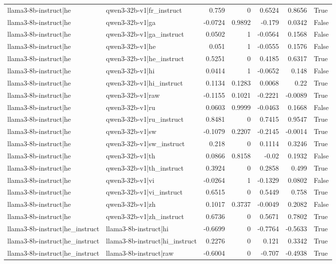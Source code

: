 \begin{table}
\begin{tabular}{l l r r r r l}
llama3-8b-instruct|he & qwen3-32b-v1|fr_instruct & 0.759 & 0 & 0.6524 & 0.8656 & True \\
llama3-8b-instruct|he & qwen3-32b-v1|ga & -0.0724 & 0.9892 & -0.179 & 0.0342 & False \\
llama3-8b-instruct|he & qwen3-32b-v1|ga_instruct & 0.0502 & 1 & -0.0564 & 0.1568 & False \\
llama3-8b-instruct|he & qwen3-32b-v1|he & 0.051 & 1 & -0.0555 & 0.1576 & False \\
llama3-8b-instruct|he & qwen3-32b-v1|he_instruct & 0.5251 & 0 & 0.4185 & 0.6317 & True \\
llama3-8b-instruct|he & qwen3-32b-v1|hi & 0.0414 & 1 & -0.0652 & 0.148 & False \\
llama3-8b-instruct|he & qwen3-32b-v1|hi_instruct & 0.1134 & 0.1283 & 0.0068 & 0.22 & True \\
llama3-8b-instruct|he & qwen3-32b-v1|raw & -0.1155 & 0.1021 & -0.2221 & -0.0089 & True \\
llama3-8b-instruct|he & qwen3-32b-v1|ru & 0.0603 & 0.9999 & -0.0463 & 0.1668 & False \\
llama3-8b-instruct|he & qwen3-32b-v1|ru_instruct & 0.8481 & 0 & 0.7415 & 0.9547 & True \\
llama3-8b-instruct|he & qwen3-32b-v1|sw & -0.1079 & 0.2207 & -0.2145 & -0.0014 & True \\
llama3-8b-instruct|he & qwen3-32b-v1|sw_instruct & 0.218 & 0 & 0.1114 & 0.3246 & True \\
llama3-8b-instruct|he & qwen3-32b-v1|th & 0.0866 & 0.8158 & -0.02 & 0.1932 & False \\
llama3-8b-instruct|he & qwen3-32b-v1|th_instruct & 0.3924 & 0 & 0.2858 & 0.499 & True \\
llama3-8b-instruct|he & qwen3-32b-v1|vi & -0.0264 & 1 & -0.1329 & 0.0802 & False \\
llama3-8b-instruct|he & qwen3-32b-v1|vi_instruct & 0.6515 & 0 & 0.5449 & 0.758 & True \\
llama3-8b-instruct|he & qwen3-32b-v1|zh & 0.1017 & 0.3737 & -0.0049 & 0.2082 & False \\
llama3-8b-instruct|he & qwen3-32b-v1|zh_instruct & 0.6736 & 0 & 0.5671 & 0.7802 & True \\
llama3-8b-instruct|he_instruct & llama3-8b-instruct|hi & -0.6699 & 0 & -0.7764 & -0.5633 & True \\
llama3-8b-instruct|he_instruct & llama3-8b-instruct|hi_instruct & 0.2276 & 0 & 0.121 & 0.3342 & True \\
llama3-8b-instruct|he_instruct & llama3-8b-instruct|raw & -0.6004 & 0 & -0.707 & -0.4938 & True \\

\end{tabular}
\end{table}
